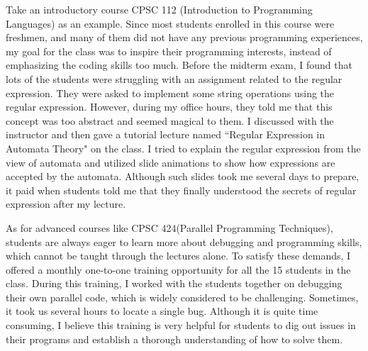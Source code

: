 \documentclass[a4paper, 10pt]{article}
\begin{document}
\begin{small}
 \begin{comment}
Furthermore, 
 I find that the process of teaching
serves to solidify my own understanding of a subject and leads to new ways of thinking about a problem
From these experience, I learned
the various demands of students with different background
and how to adjust the teaching to meet these demands.
\end{comment}


Take an introductory course CPSC 112 (Introduction to Programming Languages)
as an example. Since most students enrolled in this course
were freshmen, and many of them did not have any previous programming experiences, my goal for the class was to inspire their programming interests, instead of emphasizing the coding skills too much.  
Before the midterm exam, 
I found that lots of the students were struggling with an assignment related to the regular expression. They were asked  to implement some string operations using the regular expression. However, during my office hours, they told me that this concept was too abstract and seemed magical to them.
I discussed with the instructor and then gave a tutorial lecture named ``Regular Expression in Automata Theory" on the class. I tried to explain the regular expression from the view of automata and utilized slide animations to show how expressions are accepted by the automata. Although such slides took me several days to prepare,
it paid when students told me that they finally understood the secrets of regular expression after my lecture.

As for advanced courses like CPSC 424(Parallel Programming Techniques), students are always eager to learn more about debugging and programming skills, which cannot be taught through the lectures alone. To satisfy these demands, I offered a monthly one-to-one training opportunity for all the 15 students in the class. During this training, I worked  with the students 
together on debugging their own parallel code, which is widely considered to be challenging. Sometimes, it took us several hours to locate a single bug.
Although it is quite time consuming,  
 I believe this training is very helpful for students to dig out issues in their programs and  establish
 a thorough understanding of how to solve them. 
\begin{comment}
However, even for me,   But none of them complained about the time we spent and some ``unlucky" students even told me how exciting they were when the bug was fixed.
\end{comment}


\end{small}
\end{document}
